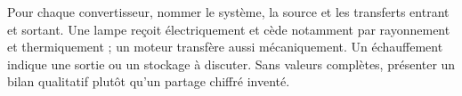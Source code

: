 \par\noindent\begin{minipage}{\linewidth}
\label{cor-activite-12}
Pour chaque convertisseur, nommer le système, la source et les transferts entrant et sortant. Une lampe reçoit électriquement et cède notamment par rayonnement et thermiquement ; un moteur transfère aussi mécaniquement. Un échauffement indique une sortie ou un stockage à discuter. Sans valeurs complètes, présenter un bilan qualitatif plutôt qu’un partage chiffré inventé.\par\end{minipage}
